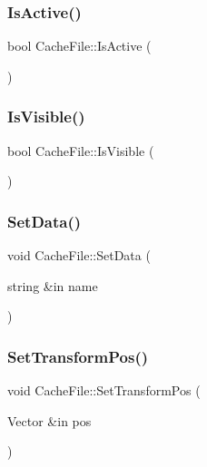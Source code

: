 \hypertarget{class_cache_file_ab4b159fa4a0c823092222722b2ba2d8a}{}\label{class_cache_file_ab4b159fa4a0c823092222722b2ba2d8a} 
\subsubsection{\texorpdfstring{Is\+Active()}{IsActive()}}
{\footnotesize\ttfamily bool Cache\+File\+::\+Is\+Active (\begin{DoxyParamCaption}{ }\end{DoxyParamCaption})}

\hypertarget{class_cache_file_a1d8c0ab49b9716df427987bceb26b82a}{}\label{class_cache_file_a1d8c0ab49b9716df427987bceb26b82a} 
\subsubsection{\texorpdfstring{Is\+Visible()}{IsVisible()}}
{\footnotesize\ttfamily bool Cache\+File\+::\+Is\+Visible (\begin{DoxyParamCaption}{ }\end{DoxyParamCaption})}

\hypertarget{class_cache_file_a74e4250433dda103bf580dca88877329}{}\label{class_cache_file_a74e4250433dda103bf580dca88877329} 
\subsubsection{\texorpdfstring{Set\+Data()}{SetData()}}
{\footnotesize\ttfamily void Cache\+File\+::\+Set\+Data (\begin{DoxyParamCaption}\item[{string \&in}]{name }\end{DoxyParamCaption})}

\hypertarget{class_cache_file_aa0873796ac7e2babf12cfcd64d20fc16}{}\label{class_cache_file_aa0873796ac7e2babf12cfcd64d20fc16} 
\subsubsection{\texorpdfstring{Set\+Transform\+Pos()}{SetTransformPos()}}
{\footnotesize\ttfamily void Cache\+File\+::\+Set\+Transform\+Pos (\begin{DoxyParamCaption}\item[{Vector \&in}]{pos }\end{DoxyParamCaption})}

